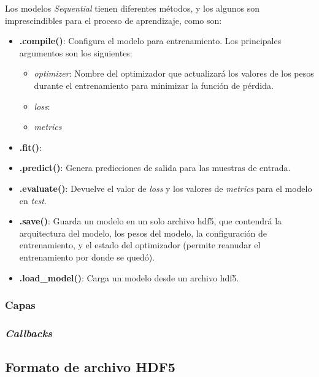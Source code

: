 Los modelos \textit{Sequential} tienen diferentes métodos, y los algunos son imprescindibles para el
proceso de aprendizaje, como son:

\begin{itemize}
    \item \textbf{.compile()}: Configura el modelo para entrenamiento. Los principales argumentos son los siguientes:
    
        \begin{itemize}
            \item \textit{optimizer}: Nombre del optimizador que actualizará los valores de los pesos durante el entrenamiento para minimizar la función de pérdida.
            \item \textit{loss}:
            \item \textit{metrics}
        \end{itemize}
    
    \item \textbf{.fit()}: 
    
    \item \textbf{.predict()}: Genera predicciones de salida para las muestras de entrada. 
    
    \item \textbf{.evaluate()}: Devuelve el valor de \textit{loss} y los valores de \textit{metrics} para el modelo en \textit{test}.
    
    \item \textbf{.save()}: Guarda un modelo en un solo archivo \acrfull{hdf5}, que contendrá la arquitectura del modelo, los pesos del modelo, la configuración de entrenamiento, y el estado del optimizador (permite reanudar el entrenamiento por donde se quedó).
    
    \item \textbf{.load\_model()}: Carga un modelo desde un archivo \acrshort{hdf5}.
\end{itemize}

\subsubsection{Capas}

\subsubsection{\textit{Callbacks}}

\subsection{Formato de archivo HDF5}

